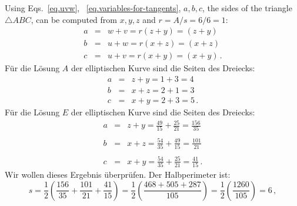 Using Eqs.~\ref{eq.uvw}, ~\ref{eq.variables-for-tangents}, $a,b,c$, the sides of the triangle $\triangle ABC$, can be computed from $x,y,z$ and $r=A/s=6/6=1$:
\begin{eqnarray*}
a&=&w+v = r(z+y)=(z+y)\\
b&=&u+w= r(x+z)=(x+z)\\
c&=&u+v=r(x+y)=(x+y)\,.
\end{eqnarray*}
Für die Lösung $A$ der elliptischen Kurve sind die Seiten des Dreiecks:
\begin{eqnarray*}
a &=& z+y = 1+3 = 4\\
b &=& x+z = 2+1=3\\
c &=& x+y = 2+3=5\,.
\end{eqnarray*}
Für die Lösung $E$ der elliptischen Kurve sind die Seiten des Dreiecks:
\begin{eqnarray*}
a &=& z+y = \frac{49}{15} + \frac{25}{21} = \frac{156}{35}\\
&&\\
b &=& x+z = \frac{54}{35} + \frac{49}{15} = \frac{101}{21}\\
&&\\
c &=& x+y = \frac{54}{35} + \frac{25}{21} =\frac{41}{15}\,.
\end{eqnarray*}
Wir wollen dieses Ergebnis überprüfen. Der Halbperimeter ist:
\[
s=\frac{1}{2}\left(\frac{156}{35} + \frac{101}{21}+\frac{41}{15}\right) = \frac{1}{2}\left(\frac{468+505+287}{105}\right) = \frac{1}{2}\left(\frac{1260}{105}\right)= 6\,,
\]
